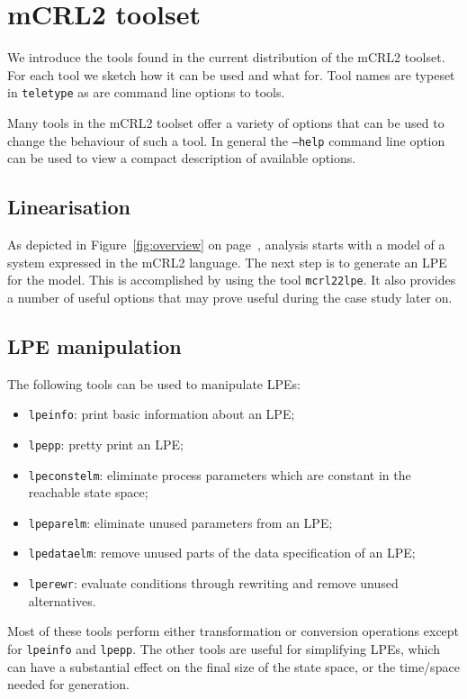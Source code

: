 \documentclass[a4paper,fleqn]{article}
\begin{document}
\section{mCRL2 toolset}
\label{sec:toolset}
  
We introduce the tools found in the current distribution of the mCRL2 toolset.
For each tool we sketch how it can be used and what for.  Tool names are
typeset in \texttt{teletype} as are command line options to tools.

Many tools in the mCRL2 toolset offer a variety of options that can be used
to change the behaviour of such a tool. In general the \texttt{--help} command
line option can be used to view a compact description of available options.

\subsection{Linearisation}

As depicted in Figure~\ref{fig:overview} on page~\pageref{fig:overview},
analysis starts with a model of a system expressed in the mCRL2 language.
The next step is to generate an LPE for the model. This is accomplished by
using the tool \texttt{mcrl22lpe}. It also provides a number of useful options
that may prove useful during the case study later on.
 

\subsection{LPE manipulation}

The following tools can be used to manipulate LPEs:
\begin{itemize} 
\item \texttt{lpeinfo}: print basic information about an LPE;
\item \texttt{lpepp}: pretty print an LPE;
\item \texttt{lpeconstelm}: eliminate process parameters which are constant in the reachable state space;
\item \texttt{lpeparelm}: eliminate unused parameters from an LPE;
\item \texttt{lpedataelm}: remove unused parts of the data specification of an LPE;
\item \texttt{lperewr}: evaluate conditions through rewriting and remove unused alternatives.
\end{itemize} 
Most of these tools perform either transformation or conversion operations
except for \texttt{lpeinfo} and \texttt{lpepp}. The other tools are useful
for simplifying LPEs, which can have a substantial effect on the final size
of the state space, or the time/space needed for generation.
 
\end{document}
